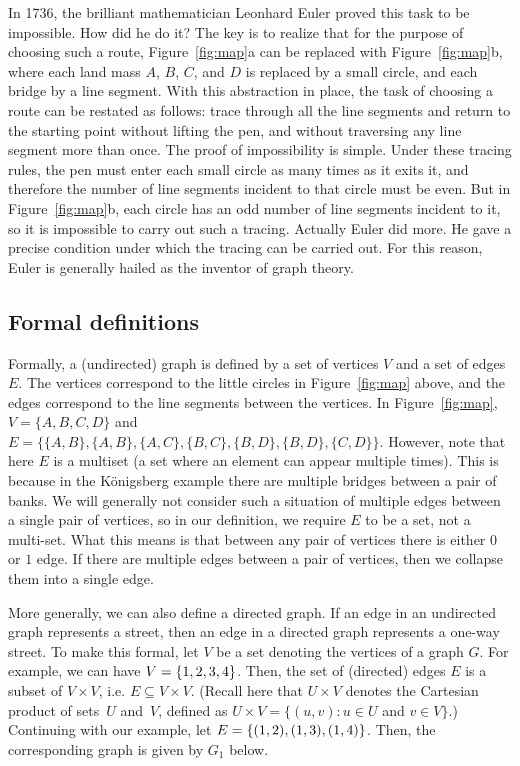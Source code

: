 \documentclass[11pt]{article}
\begin{document}
In 1736, the brilliant mathematician Leonhard Euler proved this task to be impossible. How did he do it? The key is to realize that for the purpose of choosing such a route, Figure~\ref{fig:map}a can be replaced with Figure~\ref{fig:map}b, where each land mass $A$, $B$, $C$, and $D$ is replaced by a small circle, and each bridge by a line segment. With this abstraction in place, the task of choosing a route can be restated as follows: trace through all the line segments and return to the starting point without lifting the pen, and without traversing any line segment more than once. The proof of impossibility is simple. Under these tracing rules, the pen must
enter each small circle as many times as it exits it, and therefore the number of line segments incident to that circle must be even. But in Figure~\ref{fig:map}b, each circle has an odd number of line segments incident to it, so it is impossible to carry out such a tracing. Actually Euler did more. He gave a precise condition under which the tracing can be carried out. For this reason, Euler is generally hailed as the inventor of graph theory.



\subsection{Formal definitions}

Formally, a (undirected) graph is defined by a set of vertices $V$ and a set of edges $E$. The vertices correspond to the little circles in Figure~\ref{fig:map} above, and the edges correspond to the line segments between the vertices. In Figure~\ref{fig:map}, $V = \{A, B, C, D\}$ and $E= \{\{A,B\}, \{A,B\}, \{A,C\}, \{B,C\}, \{B,D\}, \{B,D\}, \{C,D\} \}$. However, note that here $E$ is a multiset (a set where an element can appear multiple times). This is because in the K\"onigsberg example there are multiple bridges between a pair of banks. We will generally not consider such a situation of 
multiple edges between a single pair of vertices, so in our definition, we require $E$ to be a set, not a multi-set. What this means is that between any pair of vertices there is either $0$ or $1$ edge. If there are multiple edges between a pair of vertices, then we collapse them into a single edge. 

More generally, we can also define a directed graph. If an edge in an undirected graph represents a street, 
then an edge in a directed graph represents a one-way street. To make this formal, let $V$ be a set denoting the vertices of a graph $G$. For example, we can have $V={\left\{1,2,3,4\right\}}$. Then, the  set of (directed) edges $E$ is a subset of $V\times V$, i.e. $E\subseteq V\times V$. (Recall here that $U\times V$ denotes the Cartesian product of sets~$U$ and~$V$, defined as $U \times V = \{(u,v): u \in U$ and $v \in V\}$.) Continuing with our example, let $E={\left\{(1,2),(1,3),(1,4)\right\}}$. Then, the corresponding graph is given by $G_1$ below.
\end{document}
